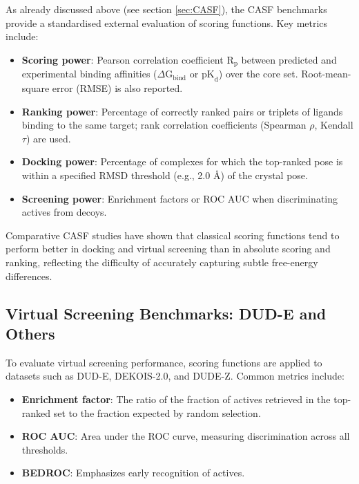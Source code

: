 \documentclass[12pt]{article}
\begin{document}
As already discussed above (see section \ref{sec:CASF}), the CASF benchmarks provide a standardised external evaluation of scoring functions\cite{CH3_Wang2014_CASF2013_Results,CH3_Su2019_CASF2016}.
Key metrics include:
\begin{itemize}
    \item \textbf{Scoring power}: Pearson correlation coefficient $\textrm{R}_\textrm{p}$ between predicted and experimental binding affinities ($\Delta \textrm{G}_{\textrm{bind}}$ or $\textrm{pK}_\textrm{d}$) over the core set. Root-mean-square error (RMSE) is also reported.
    \item \textbf{Ranking power}: Percentage of correctly ranked pairs or triplets of ligands binding to the same target; rank correlation coefficients (Spearman $\rho$, Kendall $\tau$) are used.
    \item \textbf{Docking power}: Percentage of complexes for which the top-ranked pose is within a specified RMSD threshold (e.g., 2.0 \r{A}) of the crystal pose.
    \item \textbf{Screening power}: Enrichment factors or ROC AUC when discriminating actives from decoys.
\end{itemize}

Comparative CASF studies have shown that classical scoring functions tend to perform better in docking and virtual screening than in absolute scoring and ranking, reflecting the difficulty of accurately capturing subtle free-energy differences\cite{CH3_Su2019_CASF2016,CH3_Wang2014_CASF2013_Results}.

\subsection{Virtual Screening Benchmarks: DUD-E and Others}
To evaluate virtual screening performance, scoring functions are applied to datasets such as DUD-E\cite{CH3_Mysinger2012_DUDE}, DEKOIS-2.0\cite{CH3_bauer2013}, and DUDE-Z.\cite{CH3_Mysinger2012_DUDE}
Common metrics include:
\begin{itemize}
    \item \textbf{Enrichment factor}: The ratio of the fraction of actives retrieved in the top-ranked set to the fraction expected by random selection.
    \item \textbf{ROC AUC}: Area under the ROC curve, measuring discrimination across all thresholds.
    \item \textbf{BEDROC}: Emphasizes early recognition of actives.
\end{itemize}
\end{document}

